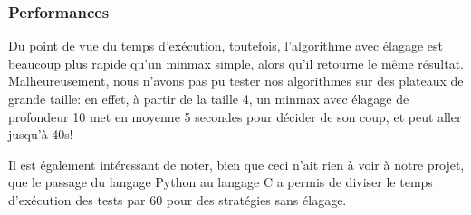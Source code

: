 \subsubsection{Performances}
Du point de vue du temps d'exécution, toutefois, l'algorithme avec
élagage est beaucoup plus rapide qu'un minmax simple, alors qu'il
retourne le même résultat.
Malheureusement, nous n'avons pas pu tester nos algorithmes sur des
plateaux de grande taille: en effet, à partir de la taille 4, un
minmax avec élagage de profondeur 10 met en moyenne 5 secondes pour
décider de son coup, et peut aller jusqu'à 40s!

Il est également intéressant de noter, bien que ceci n'ait rien à voir
à notre projet, que le passage du langage Python au langage C a permis
de diviser le temps d'exécution des tests par 60 pour des stratégies
sans élagage.
